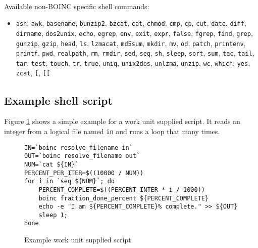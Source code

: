 \documentclass[a4paper,12pt,titlepage,dvipdfm]{article}
\begin{document}
\paragraph*{} Available non-BOINC specific shell commands:
\begin{itemize}
    \item \texttt{ash}, \texttt{awk}, \texttt{basename}, \texttt{bunzip2}, \texttt{bzcat}, \texttt{cat}, \texttt{chmod}, \texttt{cmp}, \texttt{cp},
     \texttt{cut}, \texttt{date}, \texttt{diff}, \texttt{dirname}, \texttt{dos2unix}, \texttt{echo}, \texttt{egrep}, \texttt{env}, \texttt{exit}, 
     \texttt{expr}, \texttt{false}, \texttt{fgrep}, \texttt{find}, \texttt{grep}, \texttt{gunzip}, \texttt{gzip}, \texttt{head}, \texttt{ls},
     \texttt{lzmacat}, \texttt{md5sum}, \texttt{mkdir}, \texttt{mv}, \texttt{od}, \texttt{patch}, \texttt{printenv}, \texttt{printf}, \texttt{pwd},
     \texttt{realpath}, \texttt{rm}, \texttt{rmdir}, \texttt{sed}, \texttt{seq}, \texttt{sh}, \texttt{sleep}, \texttt{sort}, \texttt{sum},
     \texttt{tac}, \texttt{tail}, \texttt{tar}, \texttt{test}, \texttt{touch}, \texttt{tr}, \texttt{true}, \texttt{uniq}, \texttt{unix2dos},
     \texttt{unlzma}, \texttt{unzip}, \texttt{wc}, \texttt{which}, \texttt{yes}, \texttt{zcat}, \texttt{[}, \texttt{[[}
\end{itemize}

\subsection{Example shell script}

Figure \ref{fig:wuscript} shows a simple example for a work unit supplied script. It reads an integer from a logical file named \texttt{in} and runs a loop that many times. 

\lstset{
  breaklines=true,                                     %
  language=make,
  frame=trbl,
  framesep=5pt,
  basicstyle=\small,
  keywordstyle=\ttfamily,
  identifierstyle=\texttt,
  stringstyle=\ttfamily,
  linewidth=\textwidth,
  numbers=left
}

\begin{figure}[htb]
\begin{lstlisting}[breaklines=true]
IN=`boinc resolve_filename in`
OUT=`boinc resolve_filename out`
NUM=`cat ${IN}`
PERCENT_PER_ITER=$((10000 / NUM))
for i in `seq ${NUM}`; do
    PERCENT_COMPLETE=$((PERCENT_INTER * i / 1000))
    boinc fraction_done_percent ${PERCENT_COMPLETE}
    echo -e "I am ${PERCENT_COMPLETE}% complete." >> ${OUT}
    sleep 1;
done
\end{lstlisting}
\caption{Example work unit supplied script}\label{fig:wuscript}
\end{figure}
\end{document}
